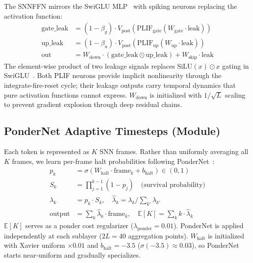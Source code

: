 \documentclass{article}
\newcommand{\vpost}{V_{\text{post}}}
\newcommand{\Expect}{\mathbb{E}}
\begin{document}
The SNNFFN mirrors the SwiGLU MLP~\citep{touvron2023llama} with spiking neurons replacing the activation function:
\begin{align}
    \text{gate\_leak} &= (1-\beta_g) \cdot \vpost(\text{PLIF}_{\text{gate}}(W_{\text{gate}} \cdot \text{leak})) \label{eq:ffn-gate} \\
    \text{up\_leak} &= (1-\beta_u) \cdot \vpost(\text{PLIF}_{\text{up}}(W_{\text{up}} \cdot \text{leak})) \label{eq:ffn-up} \\
    \text{out} &= W_{\text{down}} \cdot (\text{gate\_leak} \odot \text{up\_leak}) + W_{\text{skip}} \cdot \text{leak} \label{eq:ffn-out}
\end{align}
The element-wise product of two leakage signals replaces $\text{SiLU}(x) \odot x$ gating in SwiGLU~\citep{shazeer2020glu}.
Both PLIF neurons provide implicit nonlinearity through the integrate-fire-reset cycle; their leakage outputs carry temporal dynamics that pure activation functions cannot express.
$W_{\text{down}}$ is initialized with $1/\sqrt{L}$ scaling to prevent gradient explosion through deep residual chains.

\subsection{PonderNet Adaptive Timesteps (Module)}
\label{sec:pondernet}

Each token is represented as $K$ SNN frames.
Rather than uniformly averaging all $K$ frames, we learn per-frame halt probabilities following PonderNet~\citep{banino2021pondernet}:
\begin{align}
    p_k &= \sigma(W_{\text{halt}} \cdot \text{frame}_k + b_{\text{halt}}) \in (0, 1) \label{eq:ponder-halt} \\
    S_k &= \textstyle\prod_{j=1}^{k-1} (1 - p_j) \quad \text{(survival probability)} \label{eq:ponder-survive} \\
    \lambda_k &= p_k \cdot S_k, \quad \hat{\lambda}_k = \lambda_k / \textstyle\sum_{k'} \lambda_{k'} \label{eq:ponder-lambda} \\
    \text{output} &= \textstyle\sum_k \hat{\lambda}_k \cdot \text{frame}_k, \quad \Expect[K] = \textstyle\sum_k k \cdot \hat{\lambda}_k \label{eq:ponder-agg}
\end{align}
$\Expect[K]$ serves as a ponder cost regularizer ($\lambda_{\text{ponder}} = 0.01$).
PonderNet is applied independently at each sublayer ($2L = 40$ aggregation points).
$W_{\text{halt}}$ is initialized with Xavier uniform $\times 0.01$ and $b_{\text{halt}} = -3.5$ ($\sigma(-3.5) \approx 0.03$), so PonderNet starts near-uniform and gradually specializes.
\end{document}
